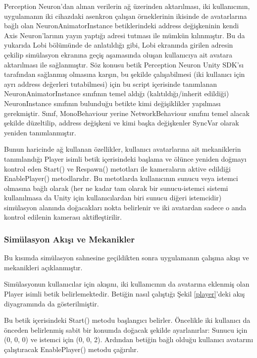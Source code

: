 \documentclass[a4paper, 12pt, titlepage]{article}
\begin{document}
Perception Neuron’dan alınan verilerin ağ üzerinden aktarılması, iki kullanıcının, uygulamanın iki
cihazdaki asenkron çalışan örneklerinin ikisinde de avatarlarına bağlı olan NeuronAnimatorInstance
betiklerindeki address değişkeninin kendi Axis Neuron’larının yayın yaptığı adresi tutması ile
mümkün kılınmıştır. Bu da yukarıda Lobi bölümünde de anlatıldığı gibi, Lobi ekranında girilen
adresin çekilip simülasyon ekranına geçiş aşamasında oluşan kullanıcıya ait avatara aktarılması ile
sağlanmıştır. Söz konusu betik Perception Neuron Unity SDK’sı tarafından sağlanmış olmasına karşın,
bu şekilde çalışabilmesi (iki kullanıcı için ayrı address değerleri tutabilmesi) için bu script
içerisinde tanımlanan NeuronAnimatorInstance sınıfının temel aldığı (kalıtıldığı/inherit edildiği)
NeuronInstance sınıfının bulunduğu betikte kimi değişiklikler yapılması gerekmiştir. Sınıf,
MonoBehaviour yerine NetworkBehaviour sınıfını temel alacak şekilde düzeltilip, address değişkeni
ve kimi başka değişkenler SyncVar olarak yeniden tanımlanmıştır.

Bunun haricinde ağ kullanan özellikler, kullanıcı avatarlarına ait mekaniklerin tanımlandığı Player
isimli betik içerisindeki başlama ve ölünce yeniden doğmayı kontrol eden Start() ve Respawn()
metotları ile kameraların aktive edildiği EnablePlayer() metodlarıdır. Bu metotlarda kullanıcının
sunucu veya istemci olmasına bağlı olarak (her ne kadar tam olarak bir sunucu-istemci sistemi
kullanılmasa da Unity için kullanıcılardan biri sunucu diğeri istemcidir) simülasyon alanında
doğacakları nokta belirlenir ve iki avatardan sadece o anda kontrol edilenin kamerası
aktifleştirilir.

\subsubsection{Simülasyon Akışı ve Mekanikler}

Bu kısımda simülasyon sahnesine geçildikten sonra uygulamanın çalışma akışı ve mekanikleri
açıklanmıştır.

Simülasyonun kullanıcılar için akışını, iki kullanıcının da avatarına eklenmiş olan Player isimli
betik belirlemektedir. Betiğin nasıl çalıştığı Şekil \ref{player}'deki akış diyagramında da
gösterilmiştir.

Bu betik içerisindeki Start() metodu başlangıcı belirler. Öncelikle iki kullanıcı da önceden
belirlenmiş sabit bir konumda doğacak şekilde ayarlanırlar: Sunucu için (0, 0, 0) ve istemci için
(0, 0, 2). Ardından betiğin bağlı olduğu kullanıcı avatarını çalıştıracak EnablePlayer() metodu
çağırılır.
\end{document}

